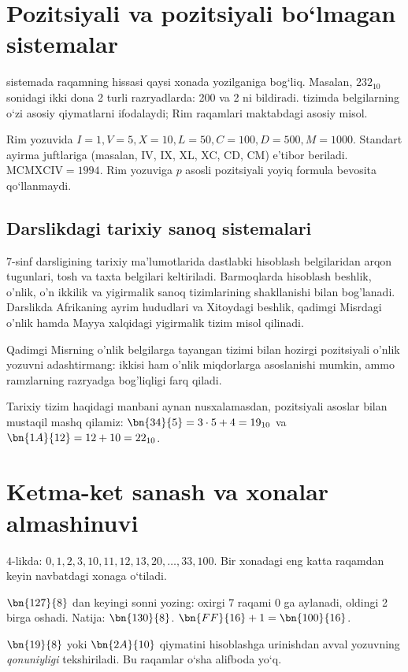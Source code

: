 \documentclass[11pt,a4paper,openany,oneside]{book}
\begin{document}
\section{Pozitsiyali va pozitsiyali bo‘lmagan sistemalar}
\begin{definition}
 sistemada raqamning hissasi qaysi xonada yozilganiga bog‘liq. Masalan, \(232_{10}\) sonidagi ikki dona 2 turli razryadlarda: 200 va 2 ni bildiradi.  tizimda belgilarning o‘zi asosiy qiymatlarni ifodalaydi; Rim raqamlari maktabdagi asosiy misol. 
\end{definition}
Rim yozuvida \(I=1,V=5,X=10,L=50,C=100,D=500,M=1000\). Standart ayirma juftlariga (masalan, IV, IX, XL, XC, CD, CM) e’tibor beriladi. \(\mathrm{MCMXCIV}=1994\). Rim yozuviga \(p\) asosli pozitsiyali yoyiq formula bevosita qo‘llanmaydi.
\subsection{Darslikdagi tarixiy sanoq sistemalari}
7-sinf darsligining tarixiy ma'lumotlarida dastlabki hisoblash belgilaridan arqon tugunlari, tosh va taxta belgilari keltiriladi. Barmoqlarda hisoblash beshlik, o'nlik, o'n ikkilik va yigirmalik sanoq tizimlarining shakllanishi bilan bog'lanadi. Darslikda Afrikaning ayrim hududlari va Xitoydagi beshlik, qadimgi Misrdagi o'nlik hamda Mayya xalqidagi yigirmalik tizim misol qilinadi. 

\begin{important}
Qadimgi Misrning o'nlik belgilarga tayangan tizimi bilan hozirgi pozitsiyali o'nlik yozuvni adashtirmang: ikkisi ham o'nlik miqdorlarga asoslanishi mumkin, ammo ramzlarning razryadga bog'liqligi farq qiladi. 
\end{important}
\begin{worked}
Tarixiy tizim haqidagi manbani aynan nusxalamasdan, pozitsiyali asoslar bilan mustaqil mashq qilamiz: \(\bn{34}{5}=3\cdot5+4=19_{10}\) va \(\bn{1A}{12}=12+10=22_{10}\).
\end{worked}

\section{Ketma-ket sanash va xonalar almashinuvi}
\(4\)-likda: \(0,1,2,3,10,11,12,13,20,\ldots,33,100\). Bir xonadagi eng katta raqamdan keyin navbatdagi xonaga o‘tiladi.
\begin{worked}
\(\bn{127}{8}\) dan keyingi sonni yozing: oxirgi 7 raqami 0 ga aylanadi, oldingi 2 birga oshadi. Natija: \(\bn{130}{8}\). \(\bn{FF}{16}+1=\bn{100}{16}\).
\end{worked}
\begin{mistake}
\(\bn{19}{8}\) yoki \(\bn{2A}{10}\) qiymatini hisoblashga urinishdan avval yozuvning \emph{qonuniyligi} tekshiriladi. Bu raqamlar o‘sha alifboda yo‘q.
\end{mistake}
\end{document}
